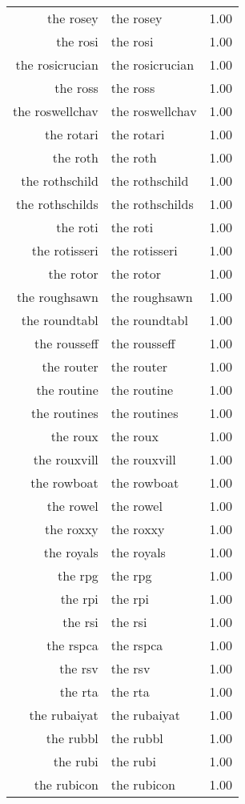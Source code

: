 \begin{table}[ht]
\begin{tabular}{rlr}
  the rosey & the rosey & 1.00 \\ 
  the rosi & the rosi & 1.00 \\ 
  the rosicrucian & the rosicrucian & 1.00 \\ 
  the ross & the ross & 1.00 \\ 
  the roswellchav & the roswellchav & 1.00 \\ 
  the rotari & the rotari & 1.00 \\ 
  the roth & the roth & 1.00 \\ 
  the rothschild & the rothschild & 1.00 \\ 
  the rothschilds & the rothschilds & 1.00 \\ 
  the roti & the roti & 1.00 \\ 
  the rotisseri & the rotisseri & 1.00 \\ 
  the rotor & the rotor & 1.00 \\ 
  the roughsawn & the roughsawn & 1.00 \\ 
  the roundtabl & the roundtabl & 1.00 \\ 
  the rousseff & the rousseff & 1.00 \\ 
  the router & the router & 1.00 \\ 
  the routine & the routine & 1.00 \\ 
  the routines & the routines & 1.00 \\ 
  the roux & the roux & 1.00 \\ 
  the rouxvill & the rouxvill & 1.00 \\ 
  the rowboat & the rowboat & 1.00 \\ 
  the rowel & the rowel & 1.00 \\ 
  the roxxy & the roxxy & 1.00 \\ 
  the royals & the royals & 1.00 \\ 
  the rpg & the rpg & 1.00 \\ 
  the rpi & the rpi & 1.00 \\ 
  the rsi & the rsi & 1.00 \\ 
  the rspca & the rspca & 1.00 \\ 
  the rsv & the rsv & 1.00 \\ 
  the rta & the rta & 1.00 \\ 
  the rubaiyat & the rubaiyat & 1.00 \\ 
  the rubbl & the rubbl & 1.00 \\ 
  the rubi & the rubi & 1.00 \\ 
  the rubicon & the rubicon & 1.00 \\ 

\end{tabular}
\end{table}
